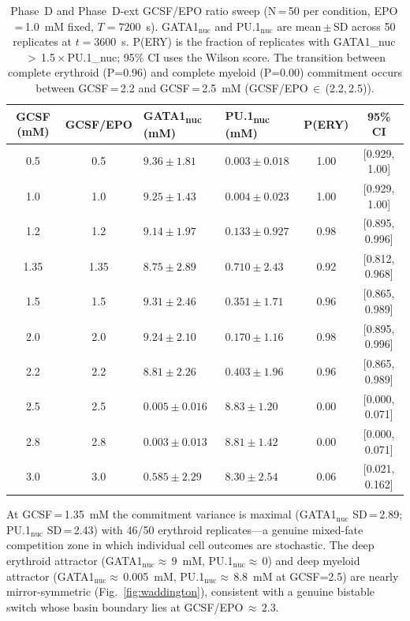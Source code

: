 \begin{table}[ht]
\caption{Phase~D and Phase~D-ext GCSF/EPO ratio sweep (N\,=\,50 per condition, EPO\,=\,1.0~mM fixed, $T=7200$~s). GATA1$_\text{nuc}$ and PU.1$_\text{nuc}$ are mean\,$\pm$\,SD across 50 replicates at $t=3600$~s. P(ERY) is the fraction of replicates with GATA1\_nuc\,$>$\,1.5\,$\times$\,PU.1\_nuc; 95\% CI uses the Wilson score. The transition between complete erythroid (P=0.96) and complete myeloid (P=0.00) commitment occurs between GCSF\,=\,2.2 and GCSF\,=\,2.5~mM (GCSF/EPO\,$\in$\,(2.2,\,2.5)).}
\label{tab:commitment_D}
\centering
\small
\begin{tabularx}{\linewidth}{@{}ccXXcc@{}}
\toprule
\textbf{GCSF (mM)} & \textbf{GCSF/EPO} & \textbf{GATA1\textsubscript{nuc} (mM)} & \textbf{PU.1\textsubscript{nuc} (mM)} & \textbf{P(ERY)} & \textbf{95\% CI} \\
\midrule
0.5 & 0.5 & $9.36 \pm 1.81$ & $0.003 \pm 0.018$ & 1.00 & [0.929, 1.00] \\
1.0 & 1.0 & $9.25 \pm 1.43$ & $0.004 \pm 0.023$ & 1.00 & [0.929, 1.00] \\
1.2 & 1.2 & $9.14 \pm 1.97$ & $0.133 \pm 0.927$ & 0.98 & [0.895, 0.996] \\
1.35 & 1.35 & $8.75 \pm 2.89$ & $0.710 \pm 2.43$ & 0.92 & [0.812, 0.968] \\
1.5 & 1.5 & $9.31 \pm 2.46$ & $0.351 \pm 1.71$ & 0.96 & [0.865, 0.989] \\
2.0 & 2.0 & $9.24 \pm 2.10$ & $0.170 \pm 1.16$ & 0.98 & [0.895, 0.996] \\
2.2 & 2.2 & $8.81 \pm 2.26$ & $0.403 \pm 1.96$ & 0.96 & [0.865, 0.989] \\
2.5 & 2.5 & $0.005 \pm 0.016$ & $8.83 \pm 1.20$ & 0.00 & [0.000, 0.071] \\
2.8 & 2.8 & $0.003 \pm 0.013$ & $8.81 \pm 1.42$ & 0.00 & [0.000, 0.071] \\
3.0 & 3.0 & $0.585 \pm 2.29$ & $8.30 \pm 2.54$ & 0.06 & [0.021, 0.162] \\
\bottomrule
\end{tabularx}
\end{table}

At GCSF\,=\,1.35~mM the commitment variance is maximal (GATA1$_\text{nuc}$ SD\,=\,2.89; PU.1$_\text{nuc}$ SD\,=\,2.43) with 46/50 erythroid replicates---a genuine mixed-fate competition zone in which individual cell outcomes are stochastic. The deep erythroid attractor (GATA1$_\text{nuc}\approx$\,9~mM, PU.1$_\text{nuc}\approx$\,0) and deep myeloid attractor (GATA1$_\text{nuc}\approx$\,0.005~mM, PU.1$_\text{nuc}\approx$\,8.8~mM at GCSF=2.5) are nearly mirror-symmetric (Fig.~\ref{fig:waddington}), consistent with a genuine bistable switch whose basin boundary lies at GCSF/EPO\,$\approx\,2.3$.

